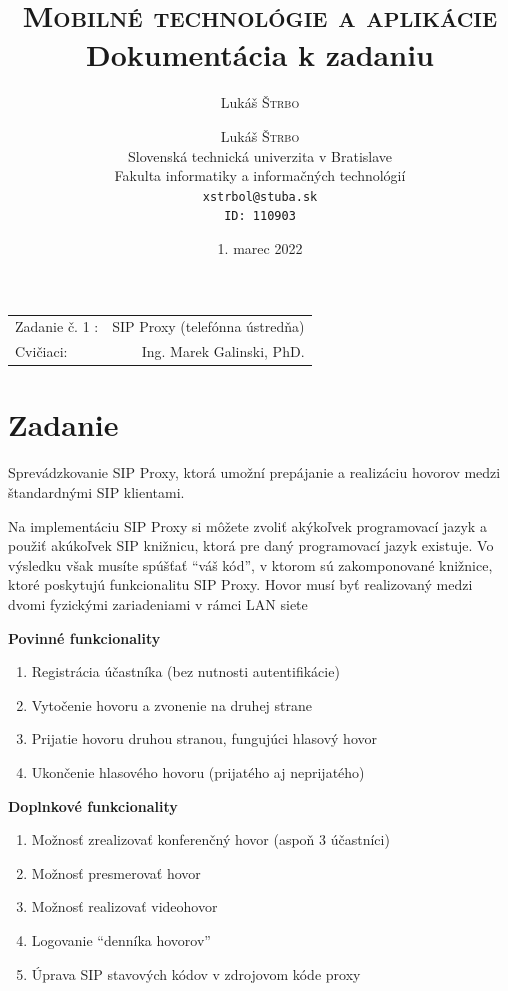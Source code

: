 \documentclass[10pt,oneside,slovak,a4paper]{article}
\title{\textsc{Mobilné technológie a aplikácie}\\ Dokumentácia k zadaniu} %
\author{Lukáš \textsc{Štrbo}} %
\date{1. marec 2022}
\author{Lukáš \textsc{Štrbo}\\[2pt]
	{\small Slovenská technická univerzita v Bratislave}\\
	{\small Fakulta informatiky a informačných technológií}\\
	{\small \texttt{xstrbol@stuba.sk}}\\
{\small \texttt{ID: 110903}}\\
	}
\begin{document}
\maketitle %

\begin{center}
\begin{tabular}{l r}
Zadanie č. 1 : & SIP Proxy (telefónna ústredňa)\\ 
Cvičiaci: & Ing. Marek Galinski, PhD.
\end{tabular}
\end{center}

\tableofcontents
\newpage

\section{Zadanie}
Sprevádzkovanie SIP Proxy, ktorá umožní prepájanie a realizáciu hovorov medzi štandardnými SIP klientami.

Na implementáciu SIP Proxy si môžete zvoliť akýkoľvek programovací jazyk a použiť akúkoľvek SIP knižnicu, ktorá pre daný programovací jazyk existuje. Vo výsledku však musíte spúšťať “váš kód”, v ktorom sú zakomponované knižnice, ktoré poskytujú funkcionalitu SIP Proxy. Hovor musí byť realizovaný medzi dvomi fyzickými zariadeniami v rámci LAN siete


\textbf{Povinné funkcionality}
\begin{enumerate}[label=(\alph*)]
	\item Registrácia účastníka (bez nutnosti autentifikácie) 
	\item Vytočenie hovoru a zvonenie na druhej strane 
	\item Prijatie hovoru druhou stranou, fungujúci hlasový hovor 
	\item Ukončenie hlasového hovoru (prijatého aj neprijatého) 
\end{enumerate}


\textbf{Doplnkové funkcionality}
\begin{enumerate}[label=(\alph*)]
	\item Možnosť zrealizovať konferenčný hovor (aspoň 3 účastníci) 
	\item Možnosť presmerovať hovor 
	\item Možnosť realizovať videohovor 
	\item Logovanie “denníka hovorov”
	\item Úprava SIP stavových kódov v zdrojovom kóde proxy
\end{enumerate}
\end{document}
